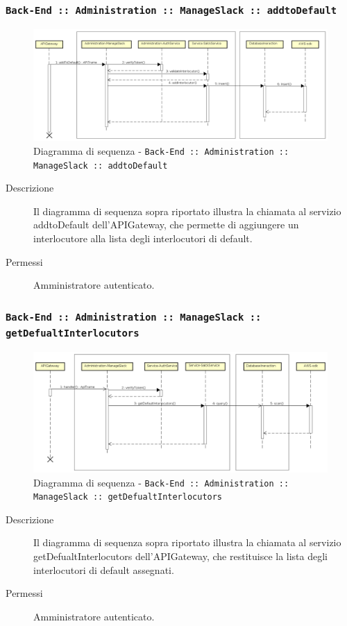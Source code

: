 \documentclass[../DefinizioneDiProdotto_v3.0.0.tex]{subfiles}
\begin{document}
\newpage
\subsubsection{\texttt{Back-End :: Administration :: ManageSlack :: addtoDefault}}
\begin{figure}[!h]
	\centering
	\includegraphics[width=\textwidth]{DiagrammiSequenza/Back-End/manageSlack/addtoDefault.png}
	\caption{Diagramma di sequenza - \texttt{Back-End :: Administration :: ManageSlack :: addtoDefault }}
\end{figure}
\begin{description}
	\item [Descrizione] Il diagramma di sequenza sopra riportato illustra la chiamata al servizio addtoDefault dell'APIGateway, che permette di aggiungere un interlocutore alla lista degli interlocutori di default.
	\item [Permessi] Amministratore autenticato.
\end{description}

\subsubsection{\texttt{Back-End :: Administration :: ManageSlack :: getDefualtInterlocutors}}
\begin{figure}[!h]
	\centering
	\includegraphics[width=\textwidth]{DiagrammiSequenza/Back-End/manageSlack/getDefaultInterlocutors.png}
	\caption{Diagramma di sequenza - \texttt{Back-End :: Administration :: ManageSlack :: getDefualtInterlocutors}}
\end{figure}
\begin{description}
	\item [Descrizione] Il diagramma di sequenza sopra riportato illustra la chiamata al servizio getDefualtInterlocutors dell'APIGateway, che restituisce la lista degli interlocutori di default assegnati.
	\item [Permessi] Amministratore autenticato.
\end{description}
\end{document}
